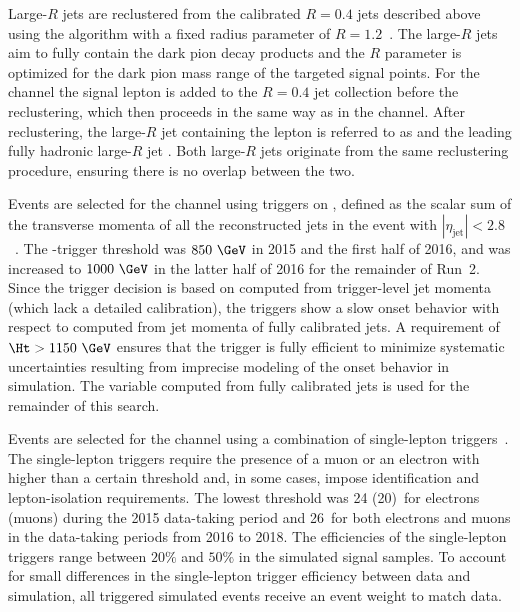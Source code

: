 Large-$R$ jets are reclustered from the calibrated $R=0.4$ jets described above using the \antikt algorithm with a fixed radius parameter of $R=1.2$~\cite{Nachman_2015}. The large-$R$ jets aim to fully contain the dark pion decay products and the $R$ parameter is optimized for the dark pion mass range of the targeted signal points. 
For the \onelep channel the signal lepton is added to the $R=0.4$ jet collection before the reclustering, which then proceeds in the same way as in the \allhad channel. After reclustering, the large-$R$ jet containing the lepton is referred to as \jlep and the leading fully hadronic large-$R$ jet \jhad. Both large-$R$ jets originate from the same reclustering procedure, ensuring there is no overlap between the two.

Events are selected for the \allhad channel using triggers on \Ht, defined as the scalar sum of the transverse momenta of all the reconstructed jets in the event with $|\eta_{\text{jet}}|<2.8$~\cite{TRIG-2012-01}. The \Ht-trigger threshold was $850~\GeV$ in 2015 and the first half of 2016, and was increased to $1000~\GeV$ in the latter half of 2016 for the remainder of Run~2. Since the trigger decision is based on \Ht computed from trigger-level jet momenta (which lack a detailed calibration), the triggers show a slow onset behavior with respect to \Ht computed from jet momenta of fully calibrated jets. A requirement of $\Ht > 1150~\GeV$ ensures that the trigger is fully efficient to minimize systematic uncertainties resulting from imprecise modeling of the onset behavior in simulation. The \Ht variable computed from fully calibrated jets is used for the remainder of this search.

Events are selected for the \onelep channel using a combination of single-lepton triggers~\cite{TRIG-2018-01,TRIG-2018-05,TRIG-2019-04,TRIG-2019-03}. The single-lepton triggers require the presence of a muon or an electron with \pt higher than a certain threshold and, in some cases, impose identification and lepton-isolation requirements. The lowest \pt threshold was 24 (20)~\GeV for electrons (muons) during the 2015 data-taking period and 26~\GeV for both electrons and muons in the data-taking periods from 2016 to 2018.
The efficiencies of the single-lepton triggers range between $20\%$ and $50\%$ in the simulated signal samples. To account for small differences in the single-lepton trigger efficiency between data and simulation, all triggered simulated events receive an event weight to match data.

